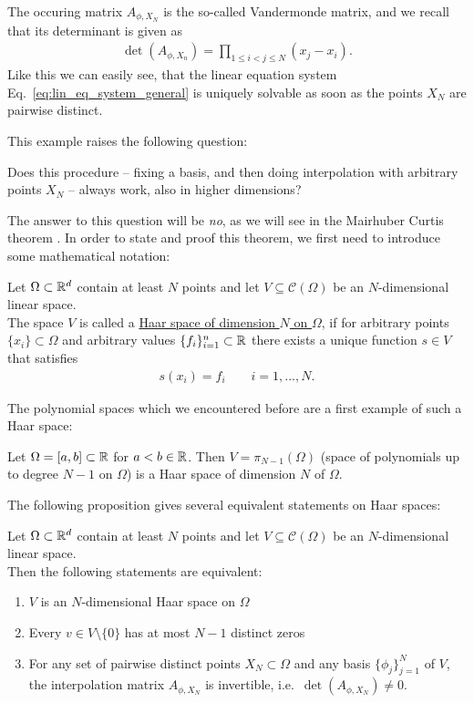 The occuring matrix $A_{\phi, X_N}$ is the so-called Vandermonde matrix, and we recall that its determinant is given as
\begin{align*}
\det(A_{\phi, X_n}) = \prod_{1 \leq i < j \leq N} (x_j - x_i).
\end{align*}
Like this we can easily see, that the linear equation system Eq.~\eqref{eq:lin_eq_system_general} is uniquely solvable as soon as the points $X_N$ are pairwise distinct.

This example raises the following question:
\begin{question}
\label{question:01}
Does this procedure -- fixing a basis, and then doing interpolation with arbitrary points $X_N$ -- always work, also in higher dimensions? 
\end{question}

The answer to this question will be \textit{no}, as we will see in the Mairhuber Curtis theorem .
In order to state and proof this theorem, we first need to introduce some mathematical notation:

\begin{definition}
	Let $\Omega \subset \mathbb{R}^d$ contain at least $N$ points and let $V \subseteq \mathcal{C}(\Omega)$ be an $N$-dimensional linear space. \\
	The space $V$ is called a \underline{Haar space of dimension $N$ on $\Omega$},
	if for arbitrary points $\{ x_i \} \subset \Omega$ and arbitrary values $\{ f_i \}_{i=1}^n \subset \mathbb{R}$ there exists a unique function $s \in V$ that satisfies 
	\begin{align*}
	s(x_i) = f_i \qquad i=1, ..., N.
	\end{align*}
\end{definition}

The polynomial spaces which we encountered before are a first example of such a Haar space:

\begin{example}
Let $\Omega = [a, b] \subset \mathbb{R}$ for $a < b \in \mathbb{R}$. 
Then $V = \pi_{N-1}(\Omega)$ (space of polynomials up to degree $N-1$ on $\Omega$) is a Haar space of dimension $N$ of $\Omega$.
\end{example}

The following proposition gives several equivalent statements on Haar spaces:

\begin{prop}
\label{prop:haar_space}
Let $\Omega \subset \mathbb{R}^d$ contain at least $N$ points and let $V \subseteq \mathcal{C}(\Omega)$ be an $N$-dimensional linear space. \\
Then the following statements are equivalent:
\begin{enumerate}
\item $V$ is an $N$-dimensional Haar space on $\Omega$
\item Every $v \in V \setminus \{ 0 \}$ has at most $N-1$ distinct zeros
\item For any set of pairwise distinct points $X_N \subset \Omega$ and any basis $\{ \phi_j \}_{j=1}^N$ of $V$, 
the interpolation matrix $A_{\phi, X_N}$ is invertible, i.e.\ $\det(A_{\phi, X_N}) \neq 0$.
\end{enumerate}
\end{prop}


